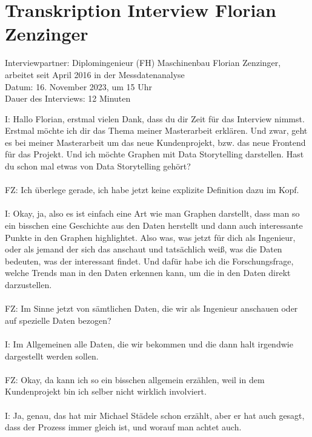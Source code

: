 \section{Transkription Interview Florian Zenzinger}
\label{appendix:interview_trends_zenzinger}
Interviewpartner: Diplomingenieur (FH) Maschinenbau Florian Zenzinger, arbeitet seit April 2016 in der Messdatenanalyse\\
Datum: 16. November 2023, um 15 Uhr\\
Dauer des Interviews: 12 Minuten\\

\begin{linenumbers}
\noindent
I: Hallo Florian, erstmal vielen Dank, dass du dir Zeit für das Interview nimmst. Erstmal möchte ich dir das Thema meiner Masterarbeit erklären. Und zwar, geht es bei meiner Masterarbeit um das neue Kundenprojekt, bzw. das neue Frontend für das Projekt. Und ich möchte Graphen mit Data Storytelling darstellen. Hast du schon mal etwas von Data Storytelling gehört?\\\\
FZ: Ich überlege gerade, ich habe jetzt keine explizite Definition dazu im Kopf.\\\\
I: Okay, ja, also es ist einfach eine Art wie man Graphen darstellt, dass man so ein bisschen eine Geschichte aus den Daten herstellt und dann auch interessante Punkte in den Graphen highlightet. Also was, was jetzt für dich als Ingenieur, oder als jemand der sich das anschaut und tatsächlich weiß, was die Daten bedeuten, was der interessant findet. Und dafür habe ich die Forschungsfrage, welche Trends man in den Daten erkennen kann, um die in den Daten direkt darzustellen.\\\\
FZ: Im Sinne jetzt von sämtlichen Daten, die wir als Ingenieur anschauen oder auf spezielle Daten bezogen?\\\\
I: Im Allgemeinen alle Daten, die wir bekommen und die dann halt irgendwie dargestellt werden sollen.\\\\
FZ: Okay, da kann ich so ein bisschen allgemein erzählen, weil in dem Kundenprojekt bin ich selber nicht wirklich involviert.\\\\
I: Ja, genau, das hat mir Michael Städele schon erzählt, aber er hat auch gesagt, dass der Prozess immer gleich ist, und worauf man achtet auch.\\\\

\end{linenumbers}
